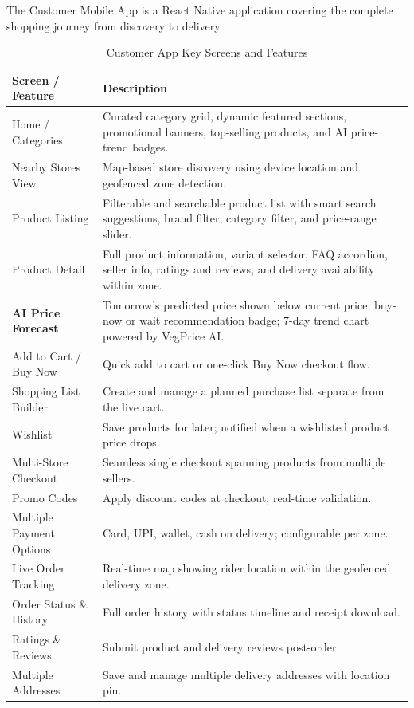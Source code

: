 \documentclass[12pt, a4paper, oneside]{report}
\begin{document}
The Customer Mobile App is a React Native application covering the complete
shopping journey from discovery to delivery.

\begin{table}[H]
\centering
\caption{Customer App Key Screens and Features}
\label{tab:customer-app}
\begin{tabularx}{\textwidth}{@{} L{3.6cm} X @{}}
\toprule
\textbf{Screen / Feature} & \textbf{Description} \\
\midrule
Home / Categories
  & Curated category grid, dynamic featured sections, promotional banners,
    top-selling products, and AI price-trend badges. \\[4pt]
Nearby Stores View
  & Map-based store discovery using device location and geofenced zone detection. \\[4pt]
Product Listing
  & Filterable and searchable product list with smart search suggestions,
    brand filter, category filter, and price-range slider. \\[4pt]
Product Detail
  & Full product information, variant selector, FAQ accordion, seller info,
    ratings and reviews, and delivery availability within zone. \\[4pt]
\textbf{AI Price Forecast}
  & Tomorrow's predicted price shown below current price; buy-now or wait
    recommendation badge; 7-day trend chart powered by VegPrice AI. \\[4pt]
Add to Cart / Buy Now
  & Quick add to cart or one-click Buy Now checkout flow. \\[4pt]
Shopping List Builder
  & Create and manage a planned purchase list separate from the live cart. \\[4pt]
Wishlist
  & Save products for later; notified when a wishlisted product price drops. \\[4pt]
Multi-Store Checkout
  & Seamless single checkout spanning products from multiple sellers. \\[4pt]
Promo Codes
  & Apply discount codes at checkout; real-time validation. \\[4pt]
Multiple Payment Options
  & Card, UPI, wallet, cash on delivery; configurable per zone. \\[4pt]
Live Order Tracking
  & Real-time map showing rider location within the geofenced delivery zone. \\[4pt]
Order Status \& History
  & Full order history with status timeline and receipt download. \\[4pt]
Ratings \& Reviews
  & Submit product and delivery reviews post-order. \\[4pt]
Multiple Addresses
  & Save and manage multiple delivery addresses with location pin. \\
\bottomrule
\end{tabularx}
\end{table}
\end{document}
